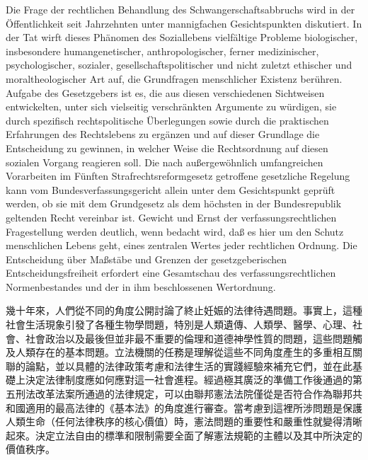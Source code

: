 \documentclass[12pt]{article}
\begin{document}
\syncleft
\begin{sourcepara}
Die Frage der rechtlichen Behandlung des Schwangerschaftsabbruchs wird in der Öffentlichkeit seit Jahrzehnten unter mannigfachen Gesichtspunkten diskutiert. In der Tat wirft dieses Phänomen des Soziallebens vielfältige Probleme biologischer, insbesondere humangenetischer, anthropologischer, ferner medizinischer, psychologischer, sozialer, gesellschaftspolitischer und nicht zuletzt ethischer und moraltheologischer Art auf, die Grundfragen menschlicher Existenz berühren. Aufgabe des Gesetzgebers ist es, die aus diesen verschiedenen Sichtweisen entwickelten, unter sich vielseitig verschränkten Argumente zu würdigen, sie durch spezifisch rechtspolitische Überlegungen sowie durch die praktischen Erfahrungen des Rechtslebens zu ergänzen und auf dieser Grundlage die Entscheidung zu gewinnen, in welcher Weise die Rechtsordnung auf diesen sozialen Vorgang reagieren soll. Die nach außergewöhnlich umfangreichen Vorarbeiten im Fünften Strafrechtsreformgesetz getroffene gesetzliche Regelung kann vom Bundesverfassungsgericht allein unter dem Gesichtspunkt geprüft werden, ob sie mit dem Grundgesetz als dem höchsten in der Bundesrepublik geltenden Recht vereinbar ist. Gewicht und Ernst der verfassungsrechtlichen Fragestellung werden deutlich, wenn bedacht wird, daß es hier um den Schutz menschlichen Lebens geht, eines zentralen Wertes jeder rechtlichen Ordnung. Die Entscheidung über Maßstäbe und Grenzen der gesetzgeberischen Entscheidungsfreiheit erfordert eine Gesamtschau des verfassungsrechtlichen Normenbestandes und der in ihm beschlossenen Wertordnung.
\end{sourcepara}
\begin{transpara}
幾十年來，人們從不同的角度公開討論了終止妊娠的法律待遇問題。事實上，這種社會生活現象引發了各種生物學問題，特別是人類遺傳、人類學、醫學、心理、社會、社會政治以及最後但並非最不重要的倫理和道德神學性質的問題，這些問題觸及人類存在的基本問題。立法機關的任務是理解從這些不同角度產生的多重相互關聯的論點，並以具體的法律政策考慮和法律生活的實踐經驗來補充它們，並在此基礎上決定法律制度應如何應對這一社會進程。經過極其廣泛的準備工作後通過的第五刑法改革法案所通過的法律規定，可以由聯邦憲法法院僅從是否符合作為聯邦共和國適用的最高法律的《基本法》的角度進行審查。當考慮到這裡所涉問題是保護人類生命（任何法律秩序的核心價值）時，憲法問題的重要性和嚴重性就變得清晰起來。決定立法自由的標準和限制需要全面了解憲法規範的主體以及其中所決定的價值秩序。
\end{transpara}
\end{document}
